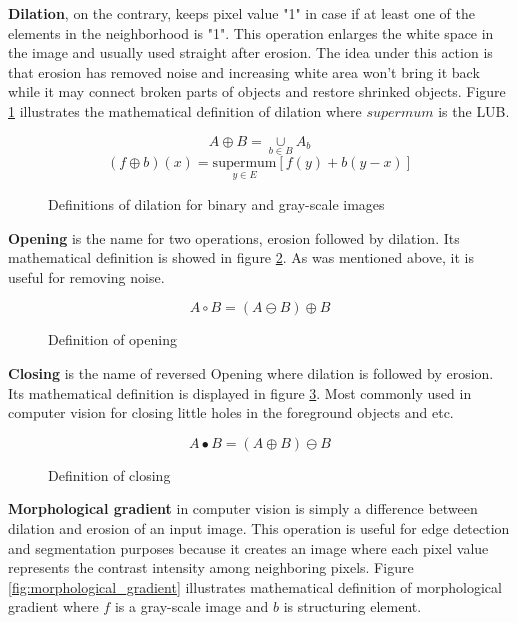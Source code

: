 \documentclass[../../../../main]{subfiles}
\begin{document}
\textbf{Dilation}, on the contrary, keeps pixel value "1" in case if at least one of the elements in the neighborhood is "1". This operation enlarges the white space in the image and usually used straight after erosion. The idea under this action is that erosion has removed noise and increasing white area won't bring it back while it may connect broken parts of objects and restore shrinked objects. Figure \ref{fig:dilation} illustrates the mathematical definition of dilation where $supermum$  is the \ac{LUB}.

\begin{figure} [!ht]
  \centering    
    \begin{equation}
        A \oplus B = \underset{b\in B}{\cup} A_b
    \end{equation}
    \begin{equation}
       (f \oplus b)(x) = \underset{y\in E}{\text{supermum}}[f(y)+b(y-x)]
    \end{equation}
    \label{fig:dilation}
  \caption{Definitions of dilation for binary and gray-scale images}
\end{figure}

\textbf{Opening} is the name for two operations, erosion followed by dilation. Its mathematical definition is showed in figure \ref{fig:opening}. As was mentioned above, it is useful for removing noise.

\begin{figure} [!ht]
  \centering    
    \begin{equation}
        A \circ B = (A \ominus B) \oplus B
    \end{equation}
    \label{fig:opening}
  \caption{Definition of opening}
\end{figure}

\textbf{Closing} is the name of reversed Opening where dilation is followed by erosion. Its mathematical definition is displayed in figure \ref{fig:closing}. Most commonly used in computer vision for closing little holes in the foreground objects and etc.

\begin{figure} [!ht]
  \centering    
    \begin{equation}
        A \bullet B = (A \oplus B) \ominus B
    \end{equation}
  \label{fig:closing}
  \caption{Definition of closing}
\end{figure}

\textbf{Morphological gradient} in computer vision is simply a difference between dilation and erosion of an input image. This operation is useful for edge detection and segmentation purposes because it creates an image where each pixel value represents the contrast intensity among neighboring pixels. Figure \ref{fig:morphological_gradient} illustrates mathematical definition of morphological gradient where $f$ is a gray-scale image and $b$ is structuring element.
\end{document}
